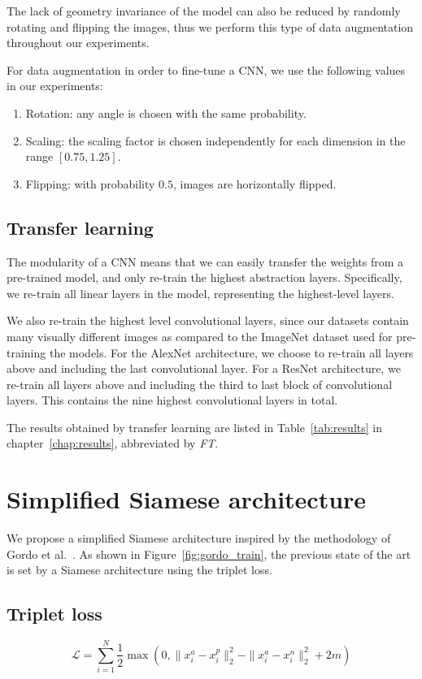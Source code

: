 The lack of geometry invariance of the model can also be reduced by
randomly rotating and flipping the images,
thus we perform this type of data augmentation
throughout our experiments.

For data augmentation in order to fine-tune a CNN, we use the
following values in our experiments:
\begin{enumerate}
    \item Rotation: any angle is chosen with the same probability.
    \item Scaling: the scaling factor is chosen independently for each
    dimension in the range $[0.75,1.25]$.
    \item Flipping: with probability $0.5$, images are horizontally
    flipped.
\end{enumerate}

\subsection{Transfer learning}
The modularity of a CNN means that we can easily transfer
the weights from a pre-trained model, and only re-train the highest
abstraction layers. Specifically, we re-train all linear layers in the
model, representing the highest-level layers.

We also re-train the highest level convolutional layers, since our datasets
contain many visually different images as compared to the ImageNet
dataset used for pre-training the models.
For the AlexNet architecture, we choose to re-train all layers above
and including the last convolutional layer.
For a ResNet architecture, we re-train all layers above and including the
third to last block of convolutional layers. This contains the
nine highest convolutional layers in total.

The results obtained by transfer learning are listed in Table~\ref{tab:results} in chapter~\ref{chap:results}, abbreviated by \emph{FT}.

\section{Simplified Siamese architecture}\label{sec:simplifiedsiam}
We propose a simplified Siamese architecture inspired by the methodology
of Gordo et al.~\cite{gordo_deep_2016}. As shown in
Figure~\ref{fig:gordo_train}, the previous state of the art is set
by a Siamese architecture using the triplet loss.

\subsection{Triplet loss}\label{sec:tripletloss}
\begin{equation}\label{eq:tripletloss}
\mathcal{L} = \sum_{i=1}^N \frac{1}{2}
\max(0, \|x^a_i - x^p_i\|_2^2 - \|x^a_i - x^n_i\|_2^2 + 2m)
\end{equation}

